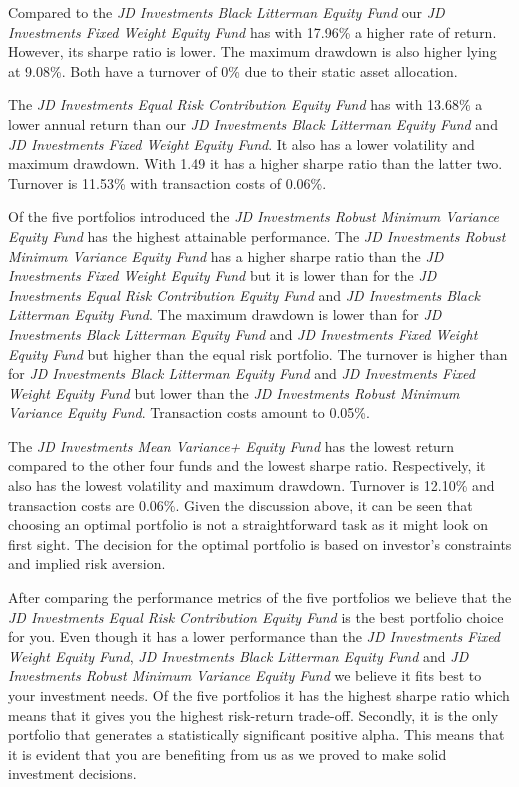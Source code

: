 \documentclass[11pt, parskip=full, DIV=14, headings=small, footsepline, footinclude=false, headsepline]{scrreprt}
\begin{document}
Compared to the \textit{JD Investments Black Litterman Equity Fund} our \textit{JD Investments Fixed Weight Equity Fund} has with 17.96\% a higher rate of return. However, its sharpe ratio is lower. The maximum drawdown is also higher lying at 9.08\%. Both have a turnover of 0\% due to their static asset allocation.

The \textit{JD Investments Equal Risk Contribution Equity Fund} has with 13.68\% a lower annual return than our \textit{JD Investments Black Litterman Equity Fund} and \textit{JD Investments Fixed Weight Equity Fund}. It also has a lower volatility and maximum drawdown. With 1.49 it has a higher sharpe ratio than the latter two. Turnover is 11.53\% with transaction costs of 0.06\%. 

Of the five portfolios introduced the \textit{JD Investments Robust Minimum Variance Equity Fund} has the highest attainable performance. The \textit{JD Investments Robust Minimum Variance Equity Fund} has a higher sharpe ratio than the \textit{JD Investments Fixed Weight Equity Fund} but it is lower than for the \textit{JD Investments Equal Risk Contribution Equity Fund} and \textit{JD Investments Black Litterman Equity Fund}. The maximum drawdown is lower than for \textit{JD Investments Black Litterman Equity Fund} and \textit{JD Investments Fixed Weight Equity Fund} but higher than the equal risk portfolio. The turnover is higher than for \textit{JD Investments Black Litterman Equity Fund} and \textit{JD Investments Fixed Weight Equity Fund} but lower than the \textit{JD Investments Robust Minimum Variance Equity Fund}. Transaction costs amount to 0.05\%.

The \textit{JD Investments Mean Variance+ Equity Fund} has the lowest return compared to the other four funds and the lowest sharpe ratio. Respectively, it also has the lowest volatility and maximum drawdown. Turnover is 12.10\% and transaction costs are 0.06\%. Given the discussion above, it can be seen that choosing an optimal portfolio is not a straightforward task as it might look on first sight. The decision for the optimal portfolio is based on investor’s constraints and implied risk aversion. 

After comparing the performance metrics of the five portfolios we believe that the \textit{JD Investments Equal Risk Contribution Equity Fund} is the best portfolio choice for you. Even though it has a lower performance than the \textit{JD Investments Fixed Weight Equity Fund}, \textit{JD Investments Black Litterman Equity Fund} and \textit{JD Investments Robust Minimum Variance Equity Fund} we believe it fits best to your investment needs. Of the five portfolios it has the highest sharpe ratio which means that it gives you the highest risk-return trade-off. Secondly, it is the only portfolio that generates a statistically significant positive alpha. This means that it is evident that you are benefiting from us as we proved to make solid investment decisions.
\end{document}
